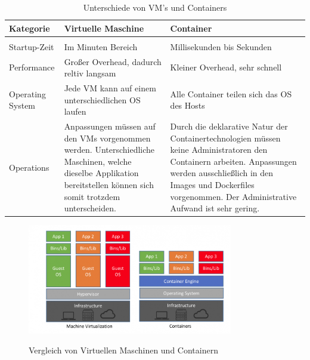 \begin{table}[ht]
        \centering
        \begin{tabular}{ | p{} | p{} | p{} | }
        Kategorie & Virtuelle Maschine & Container \\
        \hline \\
        Startup-Zeit & Im Minuten Bereich & Millisekunden bis Sekunden \\
        Performance & Großer Overhead, dadurch reltiv langsam & Kleiner Overhead, sehr schnell\\
        Operating System & Jede \ac{VM} kann auf einem unterschiedlichen \ac{OS} laufen & Alle Container teilen sich das \ac{OS} des Hosts \\
        Operations & Anpassungen müssen auf den \ac{VM}s vorgenommen werden. Unterschiedliche Maschinen, welche dieselbe Applikation bereitstellen können sich somit trotzdem unterscheiden. & Durch die deklarative Natur der Containertechnologien müssen keine Administratoren den Containern arbeiten. Anpassungen werden ausschließlich in den Images und Dockerfiles vorgenommen. Der Administrative Aufwand ist sehr gering. \\
        \end{tabular}
        \caption{Unterschiede von VM's und Containers}
        \label{table:comparison_vm_container}
\end{table}


\begin{figure}[ht]
        \caption{Vergleich von Virtuellen Maschinen und Containern\cite{vm_vs_container}}
        \centering
        \includegraphics[width=0.8\textwidth]{bilder/comparison_vm_container.png}
        \label{fig:comparison_vm_container}
\end{figure}



